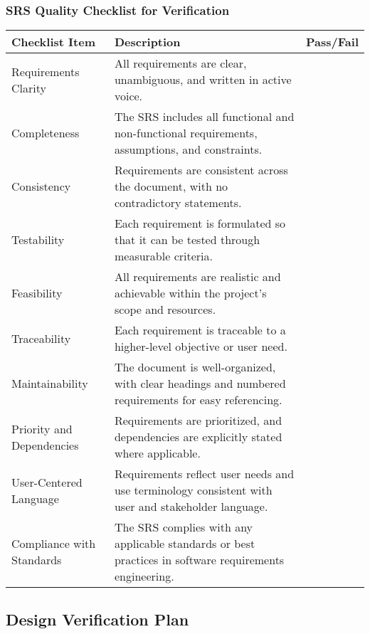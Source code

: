 \documentclass[12pt, titlepage]{article}
\begin{document}
\newpage

\subsubsection{SRS Quality Checklist for Verification}
\begin{tabular}{|>{\raggedright\arraybackslash}p{3cm}|>{\raggedright\arraybackslash}p{9cm}|>{\raggedright\arraybackslash}p{2cm}|}
	\hline
	\textbf{Checklist Item} & \textbf{Description} & \textbf{Pass/Fail} \\
	\hline
	Requirements Clarity & All requirements are clear, unambiguous, and written in active voice. & \\
	\hline
	Completeness & The SRS includes all functional and non-functional requirements, assumptions, and constraints. & \\
	\hline
	Consistency & Requirements are consistent across the document, with no contradictory statements. & \\
	\hline
	Testability & Each requirement is formulated so that it can be tested through measurable criteria. & \\
	\hline
	Feasibility & All requirements are realistic and achievable within the project's scope and resources. & \\
	\hline
	Traceability & Each requirement is traceable to a higher-level objective or user need. & \\
	\hline
	Maintainability	& The document is well-organized, with clear headings and numbered requirements for easy referencing. & \\
	\hline
	Priority and Dependencies & Requirements are prioritized, and dependencies are explicitly stated where applicable. & \\
	\hline
	User-Centered Language & Requirements reflect user needs and use terminology consistent with user and stakeholder language. & \\
	\hline
	Compliance with Standards & The SRS complies with any applicable standards or best practices in software requirements engineering. & \\
	\hline

\end{tabular}

\newpage

\subsection{Design Verification Plan}
\end{document}
